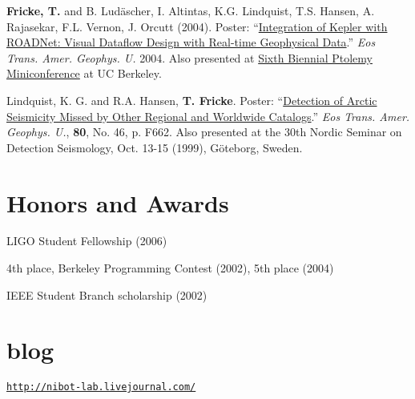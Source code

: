 \documentclass[margin,line]{res}
\begin{document}
\begin{resume}
\textbf{Fricke, T.} and B. Lud\"ascher, I. Altintas, K.G. Lindquist, T.S. Hansen, A. Rajasekar, F.L. Vernon, J. Orcutt (2004). Poster: ``\href{http://nibot-lab.livejournal.com/34289.html}{Integration of Kepler with ROADNet: Visual Dataflow Design with Real-time Geophysical Data}.'' \emph{Eos Trans. Amer. Geophys. U.} 2004. Also presented at \href{http://ptolemy.berkeley.edu/conferences/05/index.htm}{Sixth Biennial Ptolemy Miniconference} at UC Berkeley.

Lindquist, K. G. and R.A. Hansen, \textbf{T. Fricke}. Poster: ``\href{http://nibot-lab.livejournal.com/34345.html}{Detection of Arctic Seismicity Missed by Other Regional and Worldwide Catalogs}.'' \emph{Eos Trans. Amer. Geophys. U.}, \textbf{80}, No. 46, p. F662. Also presented at the 30th Nordic Seminar on Detection Seismology, Oct. 13-15 (1999), G\"oteborg, Sweden.

%
%
%
%

\section{\sc Honors and Awards} 
LIGO Student Fellowship (2006)

4th place, Berkeley Programming Contest (2002), 5th place (2004)

IEEE Student Branch scholarship (2002)

\section{\sc blog}
\href{http://nibot-lab.livejournal.com/}{\texttt{http://nibot-lab.livejournal.com/}}

\end{resume}
\end{document}
